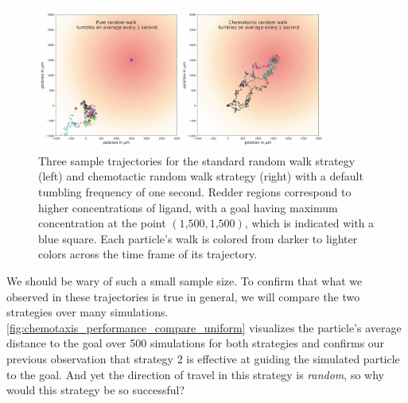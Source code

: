 \begin{figure}[h]
\centering
\mySfFamily
\includegraphics[width = 0.85\textwidth]{../images_CMYK/chemotaxis_traj_compare_uniform}
\caption{Three sample trajectories for the standard random walk strategy (left) and chemotactic random walk strategy (right) with a default tumbling frequency of one second. Redder regions correspond to higher concentrations of ligand, with a goal having maximum concentration at the point $(\text{1,500}, \text{1,500})$, which is indicated with a blue square. Each particle's walk is colored from darker to lighter colors across the time frame of its trajectory.}
\label{fig:chemotaxis_traj_compare_uniform}
\end{figure}

We should be wary of such a small sample size. To confirm that what we observed in these trajectories is true in general, we will compare the two strategies over many simulations. \autoref{fig:chemotaxis_performance_compare_uniform} visualizes the particle's average distance to the goal over 500 simulations for both strategies and confirms our previous observation that strategy 2 is effective at guiding the simulated particle to the goal. And yet the direction of travel in this strategy is \textit{random}, so why would this strategy be so successful?\\

